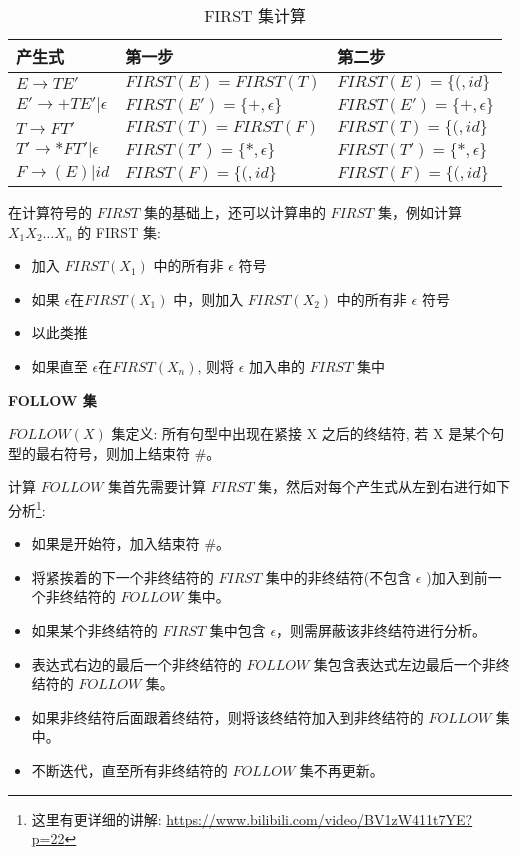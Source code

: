 \begin{table}[H]
    \centering
    \caption{FIRST 集计算}
    \label{table:FIRST 集计算}
    \setlength{\tabcolsep}{10mm}
    \begin{tabular}{l|l|l}
        \toprule
        \textbf{产生式}               & \textbf{第一步}            & \textbf{第二步}            \\
        \midrule
        $E\rightarrow TE'$            & $FIRST(E)=FIRST(T)$        & $FIRST(E)=\{(,id\}$        \\
        $E'\rightarrow+ TE'|\epsilon$ & $FIRST(E')=\{+,\epsilon\}$ & $FIRST(E')=\{+,\epsilon\}$ \\
        $T\rightarrow FT'$            & $FIRST(T)=FIRST(F)$        & $FIRST(T)=\{(,id\}$        \\
        $T'\rightarrow *FT'|\epsilon$ & $FIRST(T')=\{*,\epsilon\}$ & $FIRST(T')=\{*,\epsilon\}$ \\
        $F\rightarrow (E)|id$         & $FIRST(F)=\{(,id\}$        & $FIRST(F)=\{(,id\}$        \\
        \bottomrule
    \end{tabular}
\end{table}

在计算符号的 $FIRST$ 集的基础上，还可以计算串的 $FIRST$ 集，例如计算 $X_1 X_2 \dots X_n$ 的 FIRST 集:
\begin{itemize}
    \item 加入 $FIRST(X_1)$ 中的所有非 $\epsilon$ 符号
    \item 如果 $\epsilon$在$FIRST(X_1)$ 中，则加入 $FIRST(X_2)$ 中的所有非 $\epsilon$ 符号
    \item 以此类推
    \item 如果直至 $\epsilon$在$FIRST(X_n)$, 则将 $\epsilon$ 加入串的 $FIRST$ 集中
\end{itemize}

\noindent\textbf{FOLLOW 集}

$FOLLOW(X)$ 集定义: 所有句型中出现在紧接 X 之后的终结符, 若 X 是某个句型的最右符号，则加上结束符 \#。

计算 $FOLLOW$ 集首先需要计算 $FIRST$ 集，然后对每个产生式从左到右进行如下分析\footnote{这里有更详细的讲解: \url{https://www.bilibili.com/video/BV1zW411t7YE?p=22}}:
\begin{itemize}
    \item 如果是开始符，加入结束符 \#。
    \item 将紧挨着的下一个非终结符的 $FIRST$ 集中的非终结符(不包含 $\epsilon$ )加入到前一个非终结符的 $FOLLOW$ 集中。
    \item 如果某个非终结符的 $FIRST$ 集中包含 $\epsilon$，则需屏蔽该非终结符进行分析。
    \item 表达式右边的最后一个非终结符的 $FOLLOW$ 集包含表达式左边最后一个非终结符的 $FOLLOW$ 集。
    \item 如果非终结符后面跟着终结符，则将该终结符加入到非终结符的 $FOLLOW$ 集中。
    \item 不断迭代，直至所有非终结符的 $FOLLOW$ 集不再更新。
\end{itemize}

